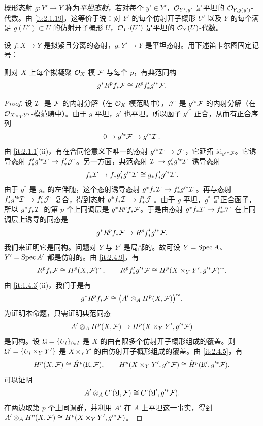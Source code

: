 概形态射 $g\colon Y'\to Y$ 称为\emph{平坦态射}，若对每个 $y'\in Y'$，$\mathcal{O}_{Y',y'}$ 是平坦的 $\mathcal{O}_{Y,g(y')}$-代数。由 \ref{it:2.1.19}，这等价于说：对 $Y'$ 的每个仿射开子概形 $U'$ 以及 $Y$ 的每个满足 $g(U')\subset U$ 的仿射开子概形 $U$，$\mathcal{O}_{Y'}(U')$ 是平坦的 $\mathcal{O}_Y(U)$-代数。

\begin{proposition}\label{it:2.4.10}
设 $f\colon X\to Y$ 是拟紧且分离的态射，$g\colon Y'\to Y$ 是平坦态射。用下述笛卡尔图固定记号：
\begin{center}
\end{center}
则对 $X$ 上每个拟凝聚 $\mathcal{O}_X$-模 $\mathcal{F}$ 与每个 $p$，有典范同构
\[
g^{*}R^pf_*\mathcal{F}\cong R^pf'_*g'^{*}\mathcal{F}.
\]
\end{proposition}

\begin{proof}
设 $\mathcal{I}^{\cdot}$ 是 $\mathcal{F}$ 的内射分解（在 $\mathcal{O}_X$-模范畴中），$\mathcal{J}^{\cdot}$ 是 $g'^{*}\mathcal{F}$ 的内射分解（在 $\mathcal{O}_{X\times_YY'}$-模范畴中）。由于 $g$ 平坦，$g'$ 也平坦。所以函子 $g'^{*}$ 正合，从而有正合序列
\[
0\to g'^{*}\mathcal{F}\to g'^{*}\mathcal{I}^{\cdot}.
\]
由 \ref{it:2.1.1}(ii)，有在合同伦意义下唯一的态射 $g'^{*}\mathcal{I}^{\cdot}\to\mathcal{J}^{\cdot}$，它延拓 $\operatorname{id}_{g'^{*}\mathcal{F}}$。它诱导态射 $f'_*g'^{*}\mathcal{I}^{\cdot}\to f'_*\mathcal{J}^{\cdot}$。另一方面，典范态射 $\mathcal{I}^{\cdot}\to g'_*g'^{*}\mathcal{I}^{\cdot}$ 诱导态射
\[
f_*\mathcal{I}^{\cdot}\to f_*g'_*g'^{*}\mathcal{I}^{\cdot}\cong g_*f'_*g'^{*}\mathcal{I}^{\cdot}.
\]
由于 $g^{*}$ 是 $g_*$ 的左伴随，这个态射诱导态射 $g^{*}f_*\mathcal{I}^{\cdot}\to f'_*g'^{*}\mathcal{I}^{\cdot}$。再与态射 $f'_*g'^{*}\mathcal{I}^{\cdot}\to f'_*\mathcal{J}^{\cdot}$ 复合，得到态射 $g^{*}f_*\mathcal{I}^{\cdot}\to f'_*\mathcal{J}^{\cdot}$。由于 $g$ 平坦，$g^{*}$ 是正合函子，所以 $g^{*}f_*\mathcal{I}^{\cdot}$ 的第 $p$ 个上同调层是 $g^{*}R^pf_*\mathcal{F}$。于是由态射 $g^{*}f_*\mathcal{I}^{\cdot}\to f'_*\mathcal{J}^{\cdot}$ 在上同调层上诱导的同态是
\[
g^{*}R^pf_*\mathcal{F}\to R^pf'_*g'^{*}\mathcal{F}.
\]
我们来证明它是同构。问题对 $Y$ 与 $Y'$ 是局部的。故可设 $Y=\operatorname{Spec} A$、$Y'=\operatorname{Spec} A'$ 都是仿射的。由 \ref{it:2.4.9}，有
\[
R^pf_*\mathcal{F}\cong H^p(X,\mathcal{F})^{\sim},\qquad
R^pf'_*g'^{*}\mathcal{F}\cong H^p(X\times_YY',g'^{*}\mathcal{F})^{\sim}.
\]
由 \ref{it:1.4.3}(ii)，我们于是有
\[
g^{*}R^pf_*\mathcal{F}\cong\bigl(A'\otimes_AH^p(X,\mathcal{F})\bigr)^{\sim}.
\]
为证明本命题，只需证明典范同态
\[
A'\otimes_AH^p(X,\mathcal{F})\to H^p(X\times_YY',g'^{*}\mathcal{F})
\]
是同构。设 $\mathfrak{U}=\{U_i\}_{i\in I}$ 是 $X$ 的由有限多个仿射开子概形组成的覆盖。则 $\mathfrak{U}'=\{U_i\times_YY'\}$ 是 $X\times_YY'$ 的由仿射开子概形组成的覆盖。由 \ref{it:2.4.5}，有
\[
H^p(X,\mathcal{F})\cong\check{H}^p(\mathfrak{U},\mathcal{F}),\qquad
H^p(X\times_YY',g'^{*}\mathcal{F})\cong\check{H}^p(\mathfrak{U}',g'^{*}\mathcal{F}).
\]
可以证明
\[
A'\otimes_AC^{\cdot}(\mathfrak{U},\mathcal{F})\cong C^{\cdot}(\mathfrak{U}',g'^{*}\mathcal{F}).
\]
在两边取第 $p$ 个上同调群，并利用 $A'$ 在 $A$ 上平坦这一事实，得到 $A'\otimes_AH^p(X,\mathcal{F})\cong H^p(X\times_YY',g'^{*}\mathcal{F})$。
\end{proof}

